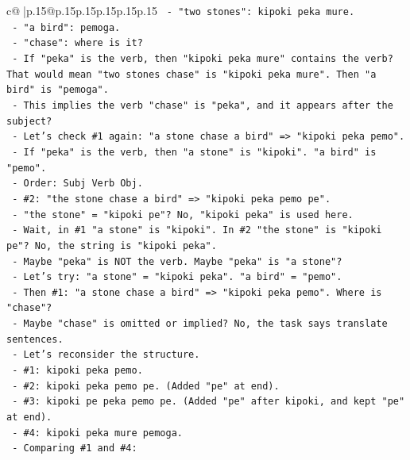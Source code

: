 \documentclass{article}
\begin{document}
{\begin{supertabular}{c@{$\;$}|p{.15\linewidth}@{}p{.15\linewidth}p{.15\linewidth}p{.15\linewidth}p{.15\linewidth}p{.15\linewidth}}
{{{\texttt{            {-} "two stones": kipoki peka mure.} \\
\texttt{            {-} "a bird": pemoga.} \\
\texttt{            {-} "chase": where is it?} \\
\texttt{            {-} If "peka" is the verb, then "kipoki peka mure" contains the verb? That would mean "two stones chase" is "kipoki peka mure". Then "a bird" is "pemoga".} \\
\texttt{            {-} This implies the verb "chase" is "peka", and it appears after the subject?} \\
\texttt{            {-} Let's check \#1 again: "a stone chase a bird" => "kipoki peka pemo".} \\
\texttt{              {-} If "peka" is the verb, then "a stone" is "kipoki". "a bird" is "pemo".} \\
\texttt{              {-} Order: Subj Verb Obj.} \\
\texttt{            {-} \#2: "the stone chase a bird" => "kipoki peka pemo pe".} \\
\texttt{              {-} "the stone" = "kipoki pe"? No, "kipoki peka" is used here.} \\
\texttt{              {-} Wait, in \#1 "a stone" is "kipoki". In \#2 "the stone" is "kipoki pe"? No, the string is "kipoki peka".} \\
\texttt{              {-} Maybe "peka" is NOT the verb. Maybe "peka" is "a stone"?} \\
\texttt{              {-} Let's try: "a stone" = "kipoki peka". "a bird" = "pemo".} \\
\texttt{              {-} Then \#1: "a stone chase a bird" => "kipoki peka pemo". Where is "chase"?} \\
\texttt{              {-} Maybe "chase" is omitted or implied? No, the task says translate sentences.} \\
\texttt{              {-} Let's reconsider the structure.} \\
\texttt{              {-} \#1: kipoki peka pemo.} \\
\texttt{              {-} \#2: kipoki peka pemo pe. (Added "pe" at end).} \\
\texttt{              {-} \#3: kipoki pe peka pemo pe. (Added "pe" after kipoki, and kept "pe" at end).} \\
\texttt{              {-} \#4: kipoki peka mure pemoga.} \\
\texttt{              {-} Comparing \#1 and \#4:} \\
}}}
\end{supertabular}}
\end{document}
